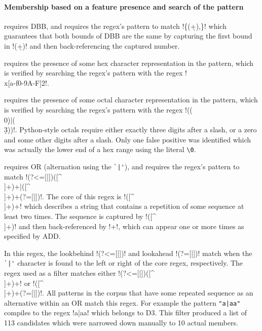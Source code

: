 \paragraph{Membership based on a feature presence and search of the pattern}
\begin{description} \itemsep -1pt
\item[S3] requires DBB, and requires the regex's pattern to match \cverb!\{(\d+),\1\}! which guarantees that both bounds of DBB are the same by capturing the first bound in \cverb!(\d+)! and then back-referencing the captured number.
\item[T2] requires the presence of some hex character representation in the pattern, which is verified by searching the regex's pattern with the regex \cverb!\\x[a-f0-9A-F]{2}!.
\item[T4] requires the presence of some octal character representation in the pattern, which is verified by searching the regex's pattern with the regex \cverb!((\\0\d*)|(\\\d{3}))!.  Python-style octals require either exactly three digits after a slash, or a zero and some other digits after a slash.  Only one false positive was identified which was actually the lower end of a hex range using the literal \verb!\0!.
\item[D3] requires OR (alternation using the \verb!`|'!), and requires the regex's pattern to match \cverb!(?<=[|])([^ \\]+)\1+|([^ \\]+)\1+(?=[|])!.  The core of this regex is \cverb!([^ \\]+)\1+! which describes a string that contains a repetition of some sequence at least two times.  The sequence is captured by \cverb!([^ \\]+)! and then back-referenced by \cverb!\1+!, which can appear one or more times as specified by ADD.

In this regex, the lookbehind \cverb!(?<=[|])! and lookahead \cverb!(?=[|])! match when the \verb!`|'! character is found to the left or right of the core regex, respectively.  The regex used as a filter matches either \cverb!(?<=[|])([^ \\]+)\1+! or \cverb!([^ \\]+)\1+(?=[|])!.  All patterns in the corpus that have some repeated sequence as an alternative within an OR match this regex.  For example the pattern \verb!"a|aa"! compiles to the regex \cverb!a|aa! which belongs to D3.  This filter produced a list of 113 candidates which were narrowed down manually to 10 actual members.


\end{description}
